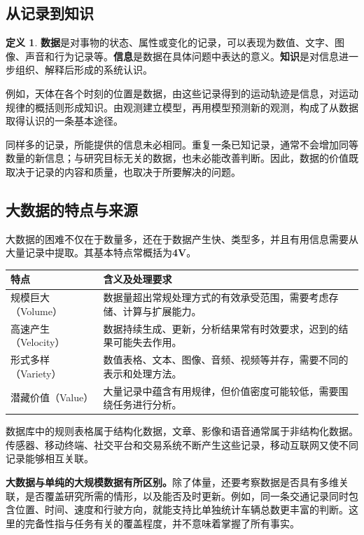 \documentclass[UTF8,fontset=fandol,a4paper,12pt]{ctexart}
\theoremstyle{definition}
\newtheorem{definition}{定义}[section]
\begin{document}
\subsection{从记录到知识}
\begin{definition}
\textbf{数据}是对事物的状态、属性或变化的记录，可以表现为数值、文字、图像、声音和行为记录等。\textbf{信息}是数据在具体问题中表达的意义。\textbf{知识}是对信息进一步组织、解释后形成的系统认识。
\end{definition}

例如，天体在各个时刻的位置是数据，由这些记录得到的运动轨迹是信息，对运动规律的概括则形成知识。由观测建立模型，再用模型预测新的观测，构成了从数据取得认识的一条基本途径。

同样多的记录，所能提供的信息未必相同。重复一条已知记录，通常不会增加同等数量的新信息；与研究目标无关的数据，也未必能改善判断。因此，数据的价值既取决于记录的内容和质量，也取决于所要解决的问题。

\subsection{大数据的特点与来源}
大数据的困难不仅在于数量多，还在于数据产生快、类型多，并且有用信息需要从大量记录中提取。其基本特点常概括为\textbf{4V}。
\begin{center}
\begin{tabular}{p{}p{}}
\toprule
特点 & 含义及处理要求\\
\midrule
规模巨大（Volume） & 数据量超出常规处理方式的有效承受范围，需要考虑存储、计算与扩展能力。\\
高速产生（Velocity） & 数据持续生成、更新，分析结果常有时效要求，迟到的结果可能失去作用。\\
形式多样（Variety） & 数值表格、文本、图像、音频、视频等并存，需要不同的表示和处理方法。\\
潜藏价值（Value） & 大量记录中蕴含有用规律，但价值密度可能较低，需要围绕任务进行分析。\\
\bottomrule
\end{tabular}
\end{center}

数据库中的规则表格属于结构化数据，文章、影像和语音通常属于非结构化数据。传感器、移动终端、社交平台和交易系统不断产生这些记录，移动互联网又使不同记录能够相互关联。

\textbf{大数据与单纯的大规模数据有所区别。}除了体量，还要考察数据是否具有多维关联，是否覆盖研究所需的情形，以及能否及时更新。例如，同一条交通记录同时包含位置、时间、速度和行驶方向，就能支持比单独统计车辆总数更丰富的判断。这里的完备性指与任务有关的覆盖程度，并不意味着掌握了所有事实。
\end{document}
